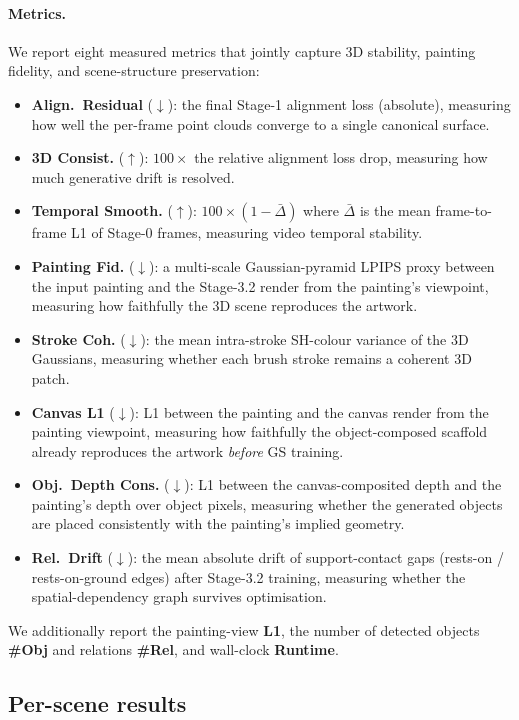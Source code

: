 \paragraph{Metrics.}
We report eight measured metrics that jointly capture 3D stability, painting
fidelity, and scene-structure preservation:
\begin{itemize}
\item \textbf{Align.\ Residual} ($\downarrow$): the final Stage-1 alignment
loss (absolute), measuring how well the per-frame point clouds converge to a
single canonical surface.
\item \textbf{3D Consist.} ($\uparrow$): $100\times$ the relative alignment
loss drop, measuring how much generative drift is resolved.
\item \textbf{Temporal Smooth.} ($\uparrow$): $100\times(1-\bar{\Delta})$
where $\bar{\Delta}$ is the mean frame-to-frame L1 of Stage-0 frames,
measuring video temporal stability.
\item \textbf{Painting Fid.} ($\downarrow$): a multi-scale Gaussian-pyramid
LPIPS proxy between the input painting and the Stage-3.2 render from the
painting's viewpoint, measuring how faithfully the 3D scene reproduces the
artwork.
\item \textbf{Stroke Coh.} ($\downarrow$): the mean intra-stroke SH-colour
variance of the 3D Gaussians, measuring whether each brush stroke remains a
coherent 3D patch.
\item \textbf{Canvas L1} ($\downarrow$): L1 between the painting and the
canvas render from the painting viewpoint, measuring how faithfully the
object-composed scaffold already reproduces the artwork \emph{before} GS
training.
\item \textbf{Obj.\ Depth Cons.} ($\downarrow$): L1 between the
canvas-composited depth and the painting's depth over object pixels,
measuring whether the generated objects are placed consistently with the
painting's implied geometry.
\item \textbf{Rel.\ Drift} ($\downarrow$): the mean absolute drift of
support-contact gaps (rests-on / rests-on-ground edges) after Stage-3.2
training, measuring whether the spatial-dependency graph survives
optimisation.
\end{itemize}
We additionally report the painting-view \textbf{L1}, the number of detected
objects \textbf{\#Obj} and relations \textbf{\#Rel}, and wall-clock
\textbf{Runtime}.

\subsection{Per-scene results}
\label{sec:exp-main}

